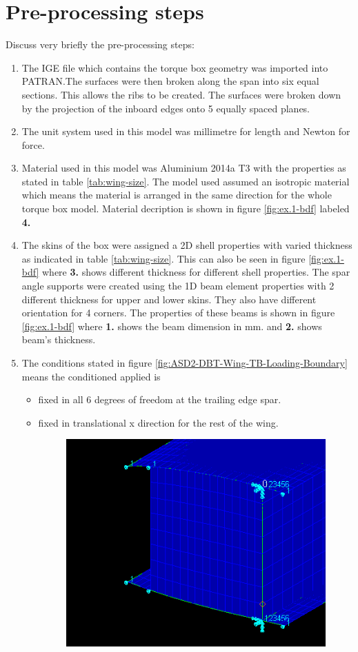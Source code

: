 \documentclass[11pt,a4paper,oneside]{memoir}
\begin{document}
\section{Pre-processing steps}Discuss very briefly the pre-processing steps:
\begin{enumerate}
    \item The IGE file which contains the torque box geometry was imported into PATRAN.The surfaces were then broken along the span into six equal sections. This allows the ribs to be created. The surfaces were broken down by the projection of the inboard edges onto 5 equally spaced planes.
    \item The unit system used in this model was millimetre for length and Newton for force.
    \item Material used in this model was Aluminium 2014a T3 with the properties as stated in table \ref{tab:wing-size}. The model used assumed an isotropic material which means the material is arranged in the same direction for the whole torque box model. Material decription is shown in figure \ref{fig:ex.1-bdf} labeled \textbf{4.}
    \item The skins of the box were assigned a 2D shell properties with varied thickness as indicated in table \ref{tab:wing-size}. This can also be seen in figure \ref{fig:ex.1-bdf} where \textbf{3.} shows different thickness for different shell properties. The spar angle supports were created using the 1D beam element properties with 2 different thickness for upper and lower skins. They also have different orientation for 4 corners. The properties of these beams is shown in figure \ref{fig:ex.1-bdf} where \textbf{1.} shows the beam dimension in mm. and \textbf{2.} shows beam's thickness.
    \item The conditions stated in figure \ref{fig:ASD2-DBT-Wing-TB-Loading-Boundary} means the conditioned applied is 
    \begin{itemize}
        \item fixed in all 6 degrees of freedom at the trailing edge spar.
        \item fixed in translational x direction for the rest of the wing.
        \begin{figure}[h]
            \centering
            \includegraphics[width = .5\textwidth]{figures/boundary-condition.png}

\end{figure}
\end{itemize}
\end{enumerate}
\end{document}
